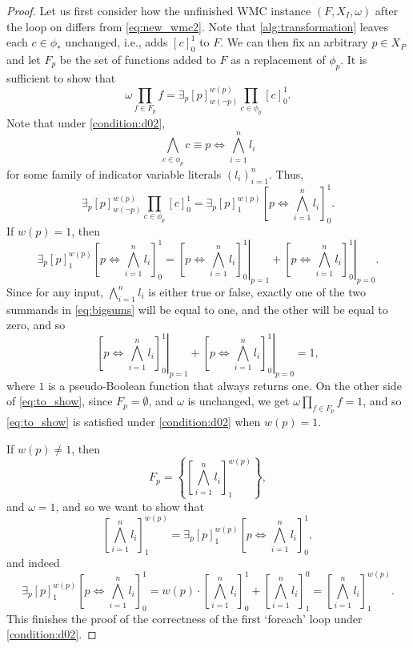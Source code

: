 \documentclass[runningheads]{llncs}
\begin{document}
\begin{proof}
  Let us first consider how the unfinished WMC instance $(F, X_I, \omega)$ after
  the loop on  differs from
  \eqref{eq:new_wmc2}. Note that \cref{alg:transformation} leaves each $c \in
  \phi_*$ unchanged, i.e., adds $[c]_0^1$ to $F$. We can then fix an arbitrary
  $p \in X_P$ and let $F_p$ be the set of functions added to $F$ as a
  replacement of $\phi_p$. It is sufficient to show that
  \begin{equation} \label{eq:to_show}
    \omega \prod_{f \in F_p} f = \exists_p [p]_{w(\neg p)}^{w(p)} \prod_{c \in \phi_p} [c]_0^1.
  \end{equation}
  Note that under \cref{condition:d02},
  \[
    \bigwedge_{c \in \phi_p} c \equiv p \Leftrightarrow \bigwedge_{i=1}^n l_i
  \]
  for some family of indicator variable literals $(l_i)_{i=1}^n$. Thus,
  \[
    \exists_p [p]_{w(\neg p)}^{w(p)} \prod_{c \in \phi_p} [c]_0^1 = \exists_p
    [p]_1^{w(p)} \left[ p \Leftrightarrow \bigwedge_{i=1}^n l_i \right]_0^1.
  \]
  If $w(p) = 1$, then
  \begin{equation} \label{eq:bigsums}
    \exists_p [p]_1^{w(p)} \left[ p \Leftrightarrow \bigwedge_{i=1}^n l_i \right]_0^1 = \left.\left[ p \Leftrightarrow \bigwedge_{i=1}^n l_i \right]_0^1\right|_{p=1} + \left.\left[ p \Leftrightarrow \bigwedge_{i=1}^n l_i \right]_0^1\right|_{p=0}.
  \end{equation}
  Since for any input, $\bigwedge_{i=1}^n l_i$ is either true or false, exactly
  one of the two summands in \cref{eq:bigsums} will be equal to one, and the
  other will be equal to zero, and so
  \[
    \left.\left[ p \Leftrightarrow \bigwedge_{i=1}^n l_i
      \right]_0^1\right|_{p=1} + \left.\left[ p \Leftrightarrow \bigwedge_{i=1}^n
        l_i \right]_0^1\right|_{p=0} = 1,
  \]
  where $1$ is a pseudo-Boolean function that always returns one. On the other
  side of \cref{eq:to_show}, since $F_p = \emptyset$, and $\omega$ is unchanged,
  we get $\omega\prod_{f \in F_p} f = 1$, and so \cref{eq:to_show} is satisfied
  under \cref{condition:d02} when $w(p) = 1$.

  If $w(p) \ne 1$, then
  \[
    F_p = \left\{ \left[ \bigwedge_{i = 1}^n l_i \right]_1^{w(p)} \right\},
  \]
  and $\omega = 1$, and so we want to show that
  \[
    \left[ \bigwedge_{i = 1}^n l_i \right]_1^{w(p)} = \exists_p [p]_1^{w(p)}
    \left[ p \Leftrightarrow \bigwedge_{i=1}^n l_i \right]_0^1,
  \]
  and indeed
  \[
    \exists_p [p]_1^{w(p)} \left[ p \Leftrightarrow \bigwedge_{i=1}^n l_i
    \right]_0^1 = w(p) \cdot \left[ \bigwedge_{i=1}^n l_i \right]_0^1 + \left[
      \bigwedge_{i=1}^n l_i \right]_1^0 = \left[ \bigwedge_{i=1}^n l_i
    \right]_1^{w(p)}.
  \]
  This finishes the proof of the correctness of the first `foreach' loop under
  \cref{condition:d02}.


\end{proof}
\end{document}
